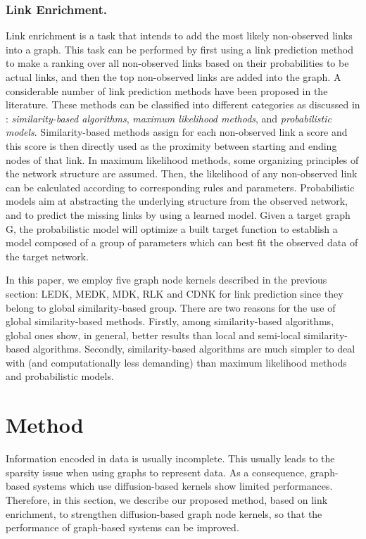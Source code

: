 \documentclass[runningheads,a4paper]{llncs}
\begin{document}
\subsubsection{Link Enrichment.}
\label{link-enrichment}
Link enrichment is a task that intends to add the most likely non-observed links into a graph. This task can be performed by first using a link prediction method to make a ranking over all non-observed links based on their probabilities to be actual links, and then the top non-observed links are added into the graph. A considerable number of link prediction methods have been proposed in the literature. These methods can be classified into different categories as discussed in \cite{jour2}: \textit{similarity-based algorithms}, \textit{maximum likelihood methods}, and \textit{probabilistic models}. Similarity-based methods assign for each non-observed link a score and this score is then directly used as the proximity between starting and ending nodes of that link. In maximum likelihood methods, some organizing principles of the network structure are assumed. Then, the likelihood of any non-observed link can be calculated according to corresponding rules and parameters. Probabilistic models aim at abstracting the underlying structure from the observed network, and to predict the missing links by using a learned model. Given a target graph G, the probabilistic model will optimize a built target function to establish a model composed of a group of parameters which can best fit the observed data of the target network.

In this paper, we employ five graph node kernels described in the previous section: LEDK, MEDK, MDK, RLK and CDNK for link prediction since they belong to global similarity-based group. There are two reasons for the use of global similarity-based methods. Firstly, among similarity-based algorithms, global ones show, in general, better results   than local and semi-local similarity-based algorithms. Secondly, similarity-based algorithms are much simpler to deal with (and computationally less demanding) than maximum likelihood methods and probabilistic models.
\section{Method}
\label{method}
Information encoded in data is usually incomplete. This usually leads to the sparsity issue when using graphs to represent  data. As a consequence,  graph-based systems which use diffusion-based kernels show limited performances. Therefore, in this section, we describe our proposed method, based on link enrichment, to strengthen diffusion-based graph node kernels, so that the performance of graph-based systems can be improved.
\end{document}
